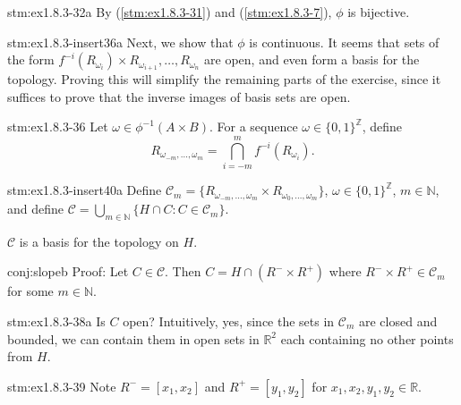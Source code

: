 \begin{statement}{stm:ex1.8.3-32a}
By (\ref{stm:ex1.8.3-31}) and (\ref{stm:ex1.8.3-7}), $\phi$ is bijective.
\end{statement}

\begin{explanation}{stm:ex1.8.3-insert36a}
Next, we show that $\phi$ is continuous. It seems that sets of the form $f^{-i}(R_{\omega_i}) \times R_{\omega_{i+1}}, \ldots, R_{\omega_n}$ are open, and even form a basis for the topology. Proving this will simplify the remaining parts of the exercise, since it suffices to prove that the inverse images of basis sets are open.
\end{explanation}

\begin{statement}{stm:ex1.8.3-36}
Let $\omega \in \phi^{-1}(A \times B)$. For a sequence $\omega \in \{0,1\}^\mathbb{Z}$, define 
\[
R_{\omega_{-m}, \ldots, \omega_{m}} = \bigcap_{i = -m}^m f^{-i}(R_{\omega_i}).
\]
\end{statement}

\begin{statement}{stm:ex1.8.3-insert40a}
Define $\mathcal{C}_m = \{ R_{\omega_{-m},\ldots,\omega_m} \times R_{\omega_0,\ldots,\omega_m} \}$, $\omega \in \{0,1\}^\mathbb{Z}$, $m \in \mathbb{N}$, and define $\mathcal{C} = \bigcup_{m \in \mathbb{N}} \{ H \cap C : C \in \mathcal{C}_m \}$.
\end{statement}

\begin{conj}\label{conj:slope}
$\mathcal{C}$ is a basis for the topology on $H$.
\end{conj}

\begin{statement}{conj:slopeb}
Proof: Let $C \in \mathcal{C}$. Then $C = H \cap (R^- \times R^+)$ where $R^- \times R^+ \in \mathcal{C}_m$ for some $m \in \mathbb{N}$.
\end{statement}

\begin{explanation}{stm:ex1.8.3-38a}
Is $C$ open? Intuitively, yes, since the sets in $\mathcal{C}_m$ are closed and bounded, we can contain them in open sets in $\mathbb{R}^2$ each containing no other points from $H$.
\end{explanation}

\begin{statement}{stm:ex1.8.3-39}
Note $R^- = [x_1, x_2]$ and $R^+ = [y_1, y_2]$ for $x_1,x_2,y_1,y_2 \in \mathbb{R}$.
\end{statement}

